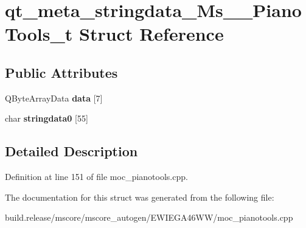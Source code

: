 \hypertarget{structqt__meta__stringdata___ms_____piano_tools__t}{}\section{qt\+\_\+meta\+\_\+stringdata\+\_\+\+Ms\+\_\+\+\_\+\+Piano\+Tools\+\_\+t Struct Reference}
\label{structqt__meta__stringdata___ms_____piano_tools__t}
\subsection*{Public Attributes}
\begin{DoxyCompactItemize}
\item 
\mbox{\label{structqt__meta__stringdata___ms_____piano_tools__t_aae35462d6a923efb4e020fcffb82725a}} 
Q\+Byte\+Array\+Data {\bfseries data} \mbox{[}7\mbox{]}
\item 
\mbox{\label{structqt__meta__stringdata___ms_____piano_tools__t_aea92beb8aa3ad31f72c4d9f6fa62026d}} 
char {\bfseries stringdata0} \mbox{[}55\mbox{]}
\end{DoxyCompactItemize}


\subsection{Detailed Description}


Definition at line 151 of file moc\+\_\+pianotools.\+cpp.



The documentation for this struct was generated from the following file\+:\begin{DoxyCompactItemize}
\item 
build.\+release/mscore/mscore\+\_\+autogen/\+E\+W\+I\+E\+G\+A46\+W\+W/moc\+\_\+pianotools.\+cpp\end{DoxyCompactItemize}
